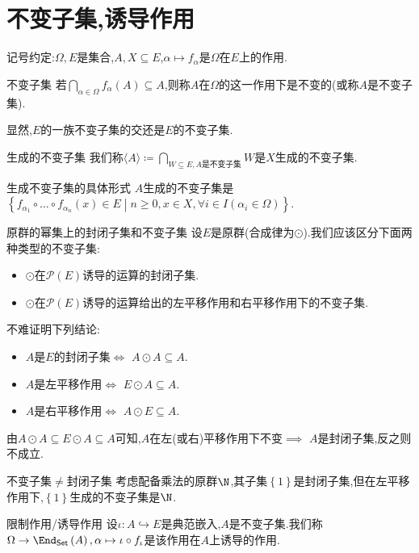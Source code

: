 \section{不变子集,诱导作用}

记号约定:$\Omega,E$是集合,$A,X\subseteq E$,$\alpha\mapsto f_{\alpha}$是$\Omega$在$E$上的作用.

\begin{definition}{不变子集}{}
	若$\bigcap\limits_{\alpha\in\Omega}f_{\alpha}\left(A\right)\subseteq A$,则称$A$在$\Omega$的这一作用下是不变的(或称$A$是不变子集).
\end{definition}

显然,$E$的一族不变子集的交还是$E$的不变子集.

\begin{definition}{生成的不变子集}{}
	我们称$\langle A\rangle\coloneq\bigcap\limits_{W\subseteq E,A\text{是不变子集}}W$是$X$生成的不变子集.
\end{definition}

\begin{proposition}{生成不变子集的具体形式}{}
	$A$生成的不变子集是$\left\{f_{\alpha_{1}}\circ\ldots\circ f_{\alpha_{n}}\left(x\right)\in E\middle|n\geq 0,x\in X,\forall i\in I\left(\alpha_{i}\in\Omega\right)\right\}$.
\end{proposition}

\begin{remark}{原群的幂集上的封闭子集和不变子集}{}
	设$E$是原群(合成律为$\odot$).我们应该区分下面两种类型的不变子集:
	\begin{itemize}
		\item $\odot$在$\mathcal{P}\left(E\right)$诱导的运算的封闭子集.
		\item $\odot$在$\mathcal{P}\left(E\right)$诱导的运算给出的左平移作用和右平移作用下的不变子集.
	\end{itemize}
	不难证明下列结论:
	\begin{itemize}
		\item $A$是$E$的封闭子集$\iff$ $A\odot A\subseteq A$.
		\item $A$是左平移作用$\iff$ $E\odot A\subseteq A$.
		\item $A$是右平移作用$\iff$ $A\odot E\subseteq A$.
	\end{itemize}
	由$A\odot A\subseteq E\odot A\subseteq A$可知,$A$在左(或右)平移作用下不变$\implies$ $A$是封闭子集,反之则不成立.
\end{remark}

\begin{example}{不变子集$\neq$封闭子集}{}
	考虑配备乘法的原群$\N$,其子集$\left\{1\right\}$是封闭子集,但在左平移作用下,$\left\{1\right\}$生成的不变子集是$\N$.
\end{example}

\begin{definition}{限制作用/诱导作用}{}
	设$\iota:A\hookrightarrow E$是典范嵌入,$A$是不变子集.我们称$\Omega\to\End_{\mathsf{Set}}\left(A\right),\alpha\mapsto \iota\circ f_{\iota}$是该作用在$A$上诱导的作用.
\end{definition}












